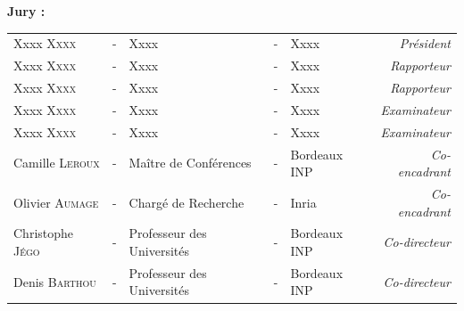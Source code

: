 \documentclass[a4paper, 11pt]{article}
\begin{document}
  \noindent \large \textbf{Jury :} \\
  \vspace*{-1.5em}
  \begin{center}
    \begin{tabular}{lclclr}
      Xxxx       \textsc{Xxxx}    & - & Xxxx                       & - & Xxxx         & \textit{Président}    \\
      Xxxx       \textsc{Xxxx}    & - & Xxxx                       & - & Xxxx         & \textit{Rapporteur}   \\
      Xxxx       \textsc{Xxxx}    & - & Xxxx                       & - & Xxxx         & \textit{Rapporteur}   \\
      Xxxx       \textsc{Xxxx}    & - & Xxxx                       & - & Xxxx         & \textit{Examinateur}  \\
      Xxxx       \textsc{Xxxx}    & - & Xxxx                       & - & Xxxx         & \textit{Examinateur}  \\
      Camille    \textsc{Leroux}  & - & Maître de Conférences      & - & Bordeaux INP & \textit{Co-encadrant} \\
      Olivier    \textsc{Aumage}  & - & Chargé de Recherche        & - & Inria        & \textit{Co-encadrant} \\
      Christophe \textsc{Jégo}    & - & Professeur des Universités & - & Bordeaux INP & \textit{Co-directeur} \\
      Denis      \textsc{Barthou} & - & Professeur des Universités & - & Bordeaux INP & \textit{Co-directeur} \\
    \end{tabular}
  \end{center}
\end{document}
